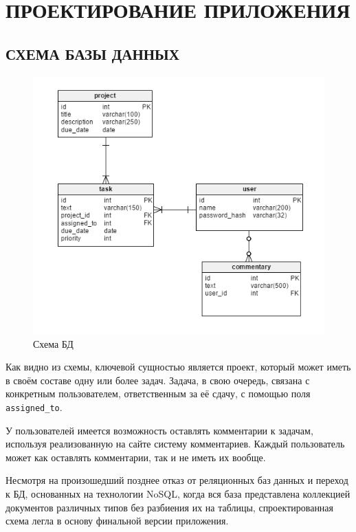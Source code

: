 \documentclass[14pt, a4paper]{extreport}
\begin{document}
\chapter{\MakeTextUppercase{Проектирование приложения}}
\section{\MakeTextUppercase{Схема базы данных}}

\begin{figure}[!htb]
  \centering
    \includegraphics[scale=0.6]{../shared_images/schema.png}
   \caption{Схема БД}
    \label{fig:start}
\end{figure}

Как видно из схемы, ключевой сущностью является проект, который может иметь в своём составе одну или более задач. Задача, в свою очередь, связана с конкретным пользователем, ответственным за её сдачу, с помощью поля {\tt assigned\_to}.

У пользователей имеется возможность оставлять комментарии к задачам, используя реализованную на сайте систему комментариев. Каждый пользователь может как оставлять комментарии, так и не иметь их вообще.

Несмотря на произошедший позднее отказ от реляционных баз данных и переход к БД, основанных на технологии NoSQL, когда вся база представлена коллекцией документов различных типов без разбиения их на таблицы, спроектированная схема легла в основу финальной версии приложения.
\end{document}
